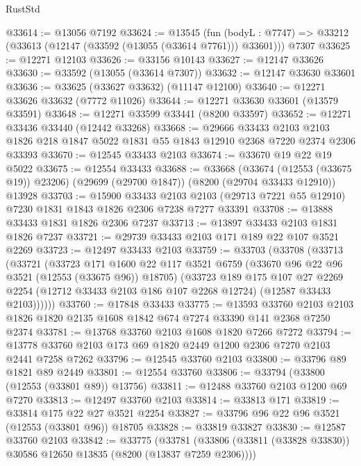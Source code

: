 \begin{lexlean}{RustStd}
\begin{coremodule}
@33614 := @13056 @7192
@33624 := @13545
    (fun (bodyL : @7747) => @33212 (@33613 (@12147 (@33592 (@13055 (@33614 @7761))) @33601)))
    @7307
@33625 := @12271 @12103
@33626 := @33156 @10143
@33627 := @12147 @33626
@33630 := @33592 (@13055 (@33614 @7307))
@33632 := @12147 @33630 @33601
@33636 := @33625 (@33627 @33632) (@11147 @12100)
@33640 := @12271 @33626 @33632 (@7772 @11026)
@33644 := @12271 @33630 @33601 (@13579 @33591)
@33648 := @12271 @33599 @33441 (@8200 @33597)
@33652 := @12271 @33436 @33440 (@12442 @33268)
@33668 := @29666
    @33433
    @2103
    @2103
    @1826
    @218
    @1847
    @5022
    @1831
    @55
    @1843
    @12910
    @2368
    @7220
    @2374
    @2306
    @33393
@33670 := @12545 @33433 @2103
@33674 := @33670 @19 @22 @19 @5022
@33675 := @12554 @33433
@33688 := @33668
    (@33674 (@12553 (@33675 @19)) @23206)
    (@29699 (@29700 @1847))
    (@8200 (@29704 @33433 @12910))
    @13928
@33703 := @15900
    @33433
    @2103
    @2103
    (@29713 @7221 @55 @12910)
    @7230
    @1831
    @1843
    @1826
    @2306
    @7238
    @7277
    @33391
@33708 := @13888 @33433 @1831 @1826 @2306 @7237
@33713 := @13897 @33433 @2103 @1831 @1826 @7237
@33721 := @29739 @33433 @2103 @171 @189 @22 @107 @3521 @2269
@33723 := @12497 @33433 @2103
@33759 := @33703
    (@33708
      (@33713
        (@33721
          (@33723
            @171
            @1600
            @22
            @117
            @3521
            @6759
            (@33670 @96 @22 @96 @3521 (@12553 (@33675 @96)) @18705)
            (@33723
              @189
              @175
              @107
              @27
              @2269
              @2254
              (@12712 @33433 @2103 @186 @107 @2268 @12724)
              (@12587 @33433 @2103))))))
@33760 := @17848 @33433
@33775 := @13593
    @33760
    @2103
    @2103
    @1826
    @1820
    @2135
    @1608
    @1842
    @674
    @7274
    @33390
    @141
    @2368
    @7250
    @2374
@33781 := @13768 @33760 @2103 @1608 @1820 @7266 @7272
@33794 := @13778 @33760 @2103 @173 @69 @1820 @2449 @1200 @2306 @7270 @2103 @2441 @7258 @7262
@33796 := @12545 @33760 @2103
@33800 := @33796 @89 @1821 @89 @2449
@33801 := @12554 @33760
@33806 := @33794 (@33800 (@12553 (@33801 @89)) @13756)
@33811 := @12488 @33760 @2103 @1200 @69 @7270
@33813 := @12497 @33760 @2103
@33814 := @33813 @171
@33819 := @33814 @175 @22 @27 @3521 @2254
@33827 := @33796 @96 @22 @96 @3521 (@12553 (@33801 @96)) @18705
@33828 := @33819 @33827
@33830 := @12587 @33760 @2103
@33842 := @33775
    (@33781 (@33806 (@33811 (@33828 @33830)) @30586 @12650 @13835 (@8200 (@13837 @7259 @2306))))

\end{coremodule}
\end{lexlean}
